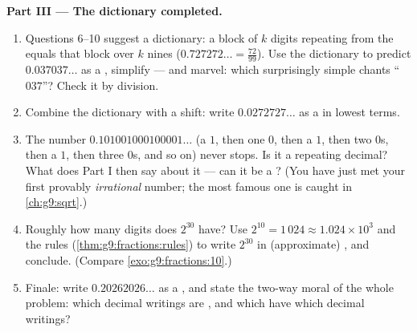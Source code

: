 \begin{problem}
\medskip
\noindent\textbf{Part III --- The dictionary completed.}
\begin{enumerate}[resume]
  \item Questions 6--10 suggest a dictionary: a block of $k$
        digits repeating from the  equals that block
        over $k$ nines ($0.727272\ldots = \frac{72}{99}$). Use
        the dictionary to predict $0.037037\ldots$ as a ,
        simplify --- and marvel: which surprisingly simple
         chants ``$037$''? Check it by division.
  \item Combine the dictionary with a shift: write
        $0.0272727\ldots$ as a  in lowest terms.
  \item The number $0.101001000100001\ldots$ (a $1$, then one
        $0$, then a $1$, then two $0$s, then a $1$, then three
        $0$s, and so on) never stops. Is it a repeating decimal?
        What does Part I then say about it --- can it be a
        ? (You have just met your first provably
        \emph{irrational} number; the most famous one is caught
        in \cref{ch:g9:sqrt}.)
  \item Roughly how many digits does $2^{30}$ have? Use
        $2^{10} = 1\,024 \approx 1.024 \times 10^3$ and the
         rules (\cref{thm:g9:fractions:rules}) to write
        $2^{30}$ in (approximate) , and
        conclude. (Compare \cref{exo:g9:fractions:10}.)
  \item Finale: write $0.20262026\ldots$ as a , and
        state the two-way moral of the whole problem: which
        decimal writings are , and which  have
        which decimal writings?
\end{enumerate}
\end{problem}
